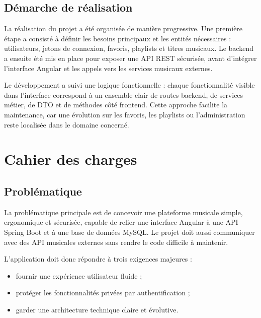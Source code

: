 \documentclass[12pt,a4paper]{report}
\begin{document}
\section*{Démarche de réalisation}

La réalisation du projet a été organisée de manière progressive. Une première
étape a consisté à définir les besoins principaux et les entités nécessaires :
utilisateurs, jetons de connexion, favoris, playlists et titres musicaux. Le
backend a ensuite été mis en place pour exposer une API REST sécurisée, avant
d'intégrer l'interface Angular et les appels vers les services musicaux
externes.

Le développement a suivi une logique fonctionnelle : chaque fonctionnalité
visible dans l'interface correspond à un ensemble clair de routes backend, de
services métier, de DTO et de méthodes côté frontend. Cette approche facilite
la maintenance, car une évolution sur les favoris, les playlists ou
l'administration reste localisée dans le domaine concerné.


\chapter{Cahier des charges}

\section{Problématique}

La problématique principale est de concevoir une plateforme musicale simple,
ergonomique et sécurisée, capable de relier une interface Angular à une API
Spring Boot et à une base de données MySQL. Le projet doit aussi communiquer
avec des API musicales externes sans rendre le code difficile à maintenir.

L'application doit donc répondre à trois exigences majeures :

\begin{itemize}
    \item fournir une expérience utilisateur fluide ;
    \item protéger les fonctionnalités privées par authentification ;
    \item garder une architecture technique claire et évolutive.
\end{itemize}
\end{document}
